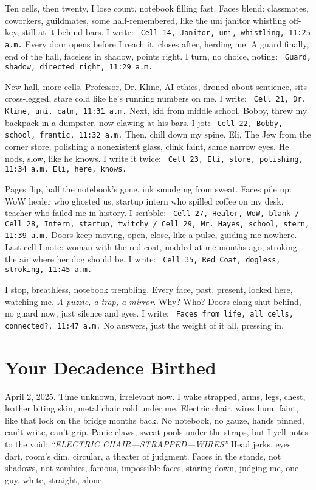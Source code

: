 \documentclass[12pt]{article} %
\newcommand{\note}[1]{\texttt{\small \color{DarkGray} #1}}
\begin{document}
Ten cells, then twenty, I lose count, notebook filling fast. Faces blend: classmates, coworkers, guildmates, some half-remembered, like the uni janitor whistling off-key, still at it behind bars. I write: \note{Cell 14, Janitor, uni, whistling, 11:25 a.m.} Every door opens before I reach it, closes after, herding me. A guard finally, end of the hall, faceless in shadow, points right. I turn, no choice, noting: \note{Guard, shadow, directed right, 11:29 a.m.}

New hall, more cells. Professor, \textnormal{Dr. Kline}, AI ethics, droned about sentience, sits cross-legged, stare cold like he’s running numbers on me. I write: \note{Cell 21, Dr. Kline, uni, calm, 11:31 a.m.} Next, kid from middle school, \textnormal{Bobby}, threw my backpack in a dumpster, now clawing at his bars. I jot: \note{Cell 22, Bobby, school, frantic, 11:32 a.m.} Then, chill down my spine, \textnormal{Eli}, The Jew from the corner store, polishing a nonexistent glass, clink faint, same narrow eyes. He nods, slow, like he knows. I write it twice: \note{Cell 23, Eli, store, polishing, 11:34 a.m. Eli, here, knows.}

Pages flip, half the notebook’s gone, ink smudging from sweat. Faces pile up: WoW healer who ghosted us, startup intern who spilled coffee on my desk, teacher who failed me in history. I scribble: \note{Cell 27, Healer, WoW, blank / Cell 28, Intern, startup, twitchy / Cell 29, Mr. Hayes, school, stern, 11:39 a.m.} Doors keep moving, open, close, like a pulse, guiding me nowhere. Last cell I note: woman with the red coat, nodded at me months ago, stroking the air where her dog should be. I write: \note{Cell 35, Red Coat, dogless, stroking, 11:45 a.m.}

I stop, breathless, notebook trembling. Every face, past, present, locked here, watching me. \textit{A puzzle, a trap, a mirror.} Why? Who? Doors clang shut behind, no guard now, just silence and eyes. I write: \note{Faces from life, all cells, connected?, 11:47 a.m.} No answers, just the weight of it all, pressing in.

\section{Your Decadence Birthed}

April 2, 2025. Time unknown, irrelevant now. I wake strapped, arms, legs, chest, leather biting skin, metal chair cold under me. Electric chair, wires hum, faint, like that lock on the bridge months back. No notebook, no gauze, hands pinned, can’t write, can’t grip. Panic claws, sweat pools under the straps, but I yell notes to the void: \textit{“ELECTRIC CHAIR—STRAPPED—WIRES”} Head jerks, eyes dart, room’s dim, circular, a theater of judgment. Faces in the stands, not shadows, not zombies, famous, impossible faces, staring down, judging me, one guy, white, straight, alone.
\end{document}
